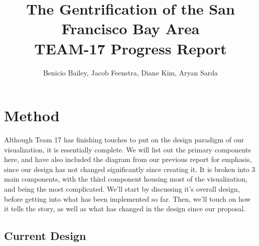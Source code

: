 \documentclass{article}
\title{The Gentrification of the San Francisco Bay Area \\ \large TEAM-17 Progress Report}
\author{Benicio Bailey, Jacob Feenstra, Diane Kim, Aryan Sarda}
\begin{document}
\maketitle

\section{Method}

Although Team 17 has finishing touches to put on the design paradigm of our visualization, it is essentially complete. We will list out the primary components here, and have also included the diagram from our previous report for emphasis, since our design has not changed significantly since creating it. It is broken into 3 main components, with the third component housing most of the visualization, and being the most complicated. We'll start by discussing it's overall design, before getting into what has been implemented so far. Then, we'll touch on how it tells the story, as well as what has changed in the design since our proposal.

\subsection{Current Design}
\end{document}
